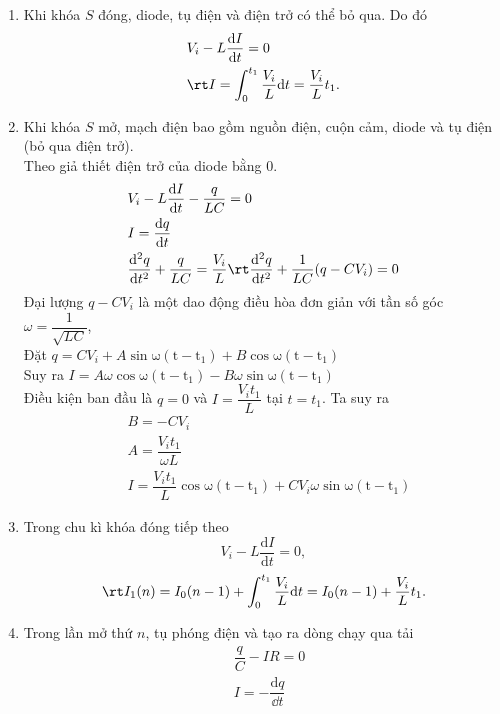 \begin{loigiai}\[\]
\begin{enumerate}[1) ]
    \item Khi khóa $S$ đóng, diode, tụ điện và điện trở có thể bỏ qua. Do đó
    \begin{align*}
        &V_{i}-L\dfrac{\mathrm{d}I}{\mathrm{d}t}=0\\
        &\rt I=\int_{0}^{t_1}\dfrac{V_{i}}{L}\mathrm{d}t=\dfrac{V_{i}}{L}t_1.
    \end{align*}
    \item Khi khóa $S$ mở, mạch điện bao gồm nguồn điện, cuộn cảm, diode và tụ điện (bỏ qua điện trở). \\
    Theo giả thiết điện trở của diode bằng $0$.
    \begin{align*}
        &V_{i}-L\dfrac{\mathrm{d}I}{\mathrm{d}t}-\dfrac{q}{LC}=0\\
        &I=\dfrac{\mathrm{d}q}{\mathrm{d}t}\\
        &\dfrac{\mathrm{d}^2q}{\mathrm{d}t^2}+\dfrac{q}{LC}=\dfrac{V_{i}}{L}\rt \dfrac{\mathrm{d}^2q}{\mathrm{d}t^2}+\dfrac{1}{LC}(q-CV_{i})=0
    \end{align*}
    Đại lượng $q-CV_{i}$ là một dao động điều hòa đơn giản với tần số góc $\omega=\dfrac{1}{\sqrt{LC}}$,\\
    Đặt $q=CV_{i}+A\mathrm{\sin{\omega(t-t_1)}}+B\mathrm{\cos{\omega(t-t_1)}}$\\
    Suy ra $I=A\omega\mathrm{\cos{\omega(t-t_1)}}-B\omega\mathrm{\sin{\omega(t-t_1)}}$\\
    Điều kiện ban đầu là $q=0$ và $I=\dfrac{V_{i}t_1}{L}$ tại $t=t_1$. Ta suy ra
    \begin{align*}
        &B=-CV_{i}\\
        &A=\dfrac{V_{i}t_1}{\omega L}\\
        &I=\dfrac{V_{i}t_1}{ L}\mathrm{\cos{\omega(t-t_1)}}+CV_{i}\omega\mathrm{\sin{\omega(t-t_1)}}
    \end{align*}
    \item Trong chu kì khóa đóng tiếp theo
    \[V_{i}-L\dfrac{\mathrm{d}I}{\mathrm{d}t}=0,\]
    \[\rt I_1(n)=I_0(n-1)+\int_0^{t_1}\dfrac{V_{i}}{L}\mathrm{d}t=I_0(n-1)+\dfrac{V_{i}}{L}t_1.\]
    \item Trong lần mở thứ $n$, tụ phóng điện và tạo ra dòng chạy qua tải
    \begin{align*}
        &\dfrac{q}{C}-IR=0\\
        &I=-\dfrac{\mathrm{d}q}{{\dd t}}\\

\end{align*}
\end{enumerate}
\end{loigiai}
